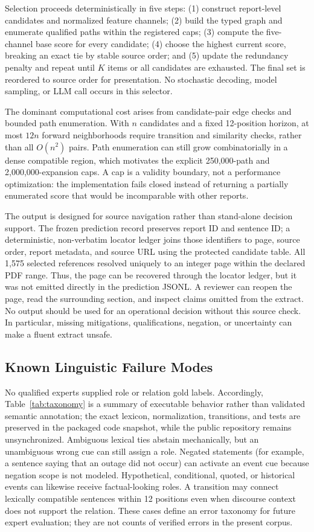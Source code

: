 \documentclass[applsci,article,submit,moreauthors]{Definitions/mdpi}
\begin{document}
Selection proceeds deterministically in five steps: (1) construct report-level candidates and normalized feature channels; (2) build the typed graph and enumerate qualified paths within the registered caps; (3) compute the five-channel base score for every candidate; (4) choose the highest current score, breaking an exact tie by stable source order; and (5) update the redundancy penalty and repeat until $K$ items or all candidates are exhausted. The final set is reordered to source order for presentation. No stochastic decoding, model sampling, or LLM call occurs in this selector.

The dominant computational cost arises from candidate-pair edge checks and bounded path enumeration. With $n$ candidates and a fixed 12-position horizon, at most $12n$ forward neighborhoods require transition and similarity checks, rather than all $O(n^2)$ pairs. Path enumeration can still grow combinatorially in a dense compatible region, which motivates the explicit 250,000-path and 2,000,000-expansion caps. A cap is a validity boundary, not a performance optimization: the implementation fails closed instead of returning a partially enumerated score that would be incomparable with other reports.

The output is designed for source navigation rather than stand-alone decision support. The frozen prediction record preserves report ID and sentence ID; a deterministic, non-verbatim locator ledger joins those identifiers to page, source order, report metadata, and source URL using the protected candidate table. All 1,575 selected references resolved uniquely to an integer page within the declared PDF range. Thus, the page can be recovered through the locator ledger, but it was not emitted directly in the prediction JSONL. A reviewer can reopen the page, read the surrounding section, and inspect claims omitted from the extract. No output should be used for an operational decision without this source check. In particular, missing mitigations, qualifications, negation, or uncertainty can make a fluent extract unsafe.

\subsection{Known Linguistic Failure Modes}

No qualified experts supplied role or relation gold labels. Accordingly, Table~\ref{tab:taxonomy} is a summary of executable behavior rather than validated semantic annotation; the exact lexicon, normalization, transitions, and tests are preserved in the packaged code snapshot, while the public repository remains unsynchronized. Ambiguous lexical ties abstain mechanically, but an unambiguous wrong cue can still assign a role. Negated statements (for example, a sentence saying that an outage did not occur) can activate an event cue because negation scope is not modeled. Hypothetical, conditional, quoted, or historical events can likewise receive factual-looking roles. A transition may connect lexically compatible sentences within 12 positions even when discourse context does not support the relation. These cases define an error taxonomy for future expert evaluation; they are not counts of verified errors in the present corpus.
\end{document}
